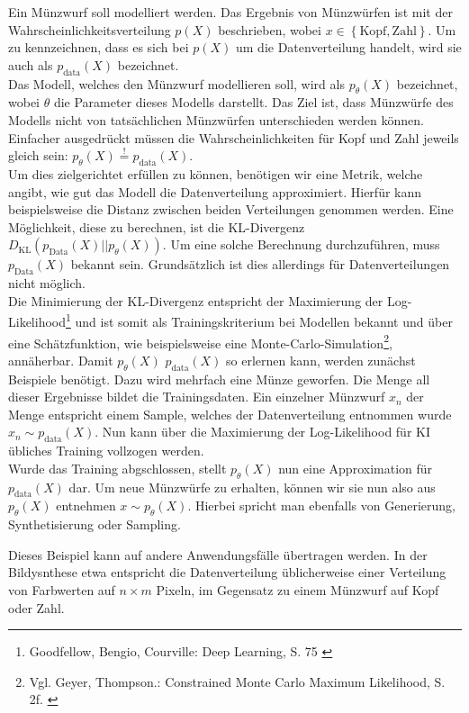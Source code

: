 Ein Münzwurf soll modelliert werden. Das Ergebnis von Münzwürfen ist mit der Wahrscheinlichkeitsverteilung $p(X)$ beschrieben, wobei $x \in \left \{ \text{Kopf}, \text{Zahl} \right \}$. Um zu kennzeichnen, dass es sich bei $p(X)$ um die Datenverteilung handelt, wird sie auch als $p_\text{data}(X)$ bezeichnet. \\
Das Modell, welches den Münzwurf modellieren soll, wird als $p_\theta(X)$ bezeichnet, wobei $\theta$ die Parameter dieses Modells darstellt. Das Ziel ist, dass Münzwürfe des Modells nicht von tatsächlichen Münzwürfen unterschieden werden können. Einfacher ausgedrückt müssen die Wahrscheinlichkeiten für Kopf und Zahl jeweils gleich sein: $p_\theta(X) \overset{!}{=} p_\text{data}(X)$. \\ 
Um dies zielgerichtet erfüllen zu können, benötigen wir eine Metrik, welche angibt, wie gut das Modell die Datenverteilung approximiert. Hierfür kann beispielsweise die Distanz zwischen beiden Verteilungen genommen werden. Eine Möglichkeit, diese zu berechnen, ist die KL-Divergenz $D_\text{KL}(p_\text{Data}(X)||p_\theta(X))$. Um eine solche Berechnung durchzuführen, muss $p_\text{Data}(X)$ bekannt sein. Grundsätzlich ist dies allerdings für Datenverteilungen nicht möglich. \\
Die Minimierung der KL-Divergenz entspricht der Maximierung der Log-Likelihood\footnote{
    Goodfellow, Bengio, Courville: Deep Learning, S. 75
    \cite{Goodfellow-et-al-2016}
} und ist somit als Trainingskriterium bei Modellen bekannt und über eine Schätzfunktion, wie beispielsweise eine Monte-Carlo-Simulation\footnote{
    Vgl. Geyer, Thompson.: Constrained Monte Carlo Maximum Likelihood, S. 2f. 
    \cite{geyer1992constrained}
}, annäherbar.
Damit $p_\theta(X)$ $p_\text{data}(X)$ so erlernen kann, werden zunächst Beispiele benötigt. Dazu wird mehrfach eine Münze geworfen. Die Menge all dieser Ergebnisse bildet die Trainingsdaten. Ein einzelner Münzwurf $x_n$ der Menge entspricht einem Sample, welches der Datenverteilung entnommen wurde $x_n \sim p_\text{data}(X)$. Nun kann über die Maximierung der Log-Likelihood für \ac{KI} übliches Training vollzogen werden. \\
Wurde das Training abgschlossen, stellt $p_\theta(X)$ nun eine Approximation für $p_\text{data}(X)$ dar. Um neue Münzwürfe zu erhalten, können wir sie nun also aus $p_\theta(X)$ entnehmen $x \sim p_\theta(X)$. Hierbei spricht man ebenfalls von Generierung, Synthetisierung oder Sampling.

Dieses Beispiel kann auf andere Anwendungsfälle übertragen werden. In der Bildysnthese etwa entspricht die Datenverteilung üblicherweise einer Verteilung von Farbwerten auf $n \times m$ Pixeln, im Gegensatz zu einem Münzwurf auf Kopf oder Zahl.


